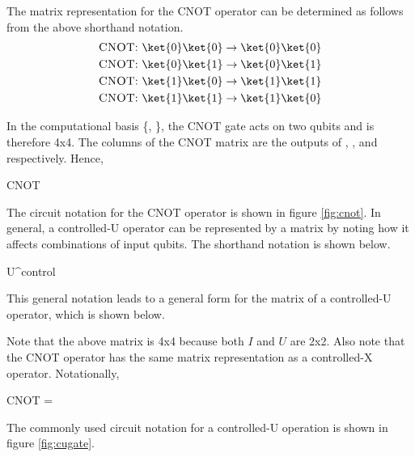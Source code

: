 \beq
{}  \rightarrow {}
\eeq

The matrix representation for the \textsc{CNOT} operator can be determined as follows from the above shorthand notation.
\begin{align}
\text{\textsc{CNOT}: } \ket{0}\ket{0} &\rightarrow \ket{0}\ket{0}\\
\text{\textsc{CNOT}: } \ket{0}\ket{1} &\rightarrow \ket{0}\ket{1}\\
\text{\textsc{CNOT}: } \ket{1}\ket{0} &\rightarrow \ket{1}\ket{1}\\
\text{\textsc{CNOT}: } \ket{1}\ket{1} &\rightarrow \ket{1}\ket{0}
\end{align}

In the computational basis \{, \}, the \textsc{CNOT} gate acts on two qubits and is therefore 4x4. The columns of the \textsc{CNOT} matrix are the outputs of , ,  and  respectively. Hence,

\beq
\textsc{CNOT} \equiv {}
\eeq


The circuit notation for the \textsc{CNOT} operator is shown in figure \ref{fig:cnot}. In general, a controlled-U operator can be represented by a matrix by noting how it affects combinations of input qubits. The shorthand notation is shown below.

\beq
{}  \rightarrow {}U^{control}
\eeq

This general notation leads to a general form for the matrix of a controlled-U operator, which is shown below.

\beq
{} \equiv {}
\eeq

Note that the above matrix is 4x4 because both $I$ and $U$ are 2x2. Also note that the \textsc{CNOT} operator has the same matrix representation as a controlled-X operator. Notationally,

\beq
\textsc{CNOT} \equiv {} = 
\eeq

The commonly used circuit notation for a controlled-U operation is shown in figure \ref{fig:cugate}.


